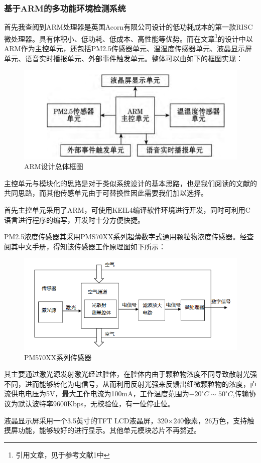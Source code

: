 \documentclass[a4paper, 11pt]{article} %
\begin{document}
\subsubsection{基于ARM的多功能环境检测系统}
\par{} 首先我查阅到ARM处理器是英国Acorn有限公司设计的低功耗成本的第一款RISC微处理器。具有体积小、低功耗、低成本、高性能等优势。而在文章\footnote{引用文章，见于参考文献1中}的设计中以ARM作为主控单元，还包括PM2.5传感器单元、温湿度传感器单元、液晶显示屏单元、语音实时播报单元、外部事件触发单元\cite{qal2017jy}。整体可以由如下的框图实现：
\begin{figure}[H]
  \centering
  \includegraphics[scale = 0.7 ]{1-2.png}
  \caption{ARM设计总体框图}
  \label{img2} 
\end{figure}
\par{} 主控单元与模块化的思路是对于类似系统设计的基本思路，也是我们阅读的文献的共同思路，而其他传感单元由于可替换性因此需要我们加以选择。
\par{} 首先主控单元采用了ARM，可使用KEIL4编译软件环境进行开发，同时可利用C语言进行程序的编写，开发时十分方便快捷。
\par{} PM2.5浓度传感器其采用PMS70XX系列超薄数字式通用颗粒物浓度传感器。经查阅其中文手册，得知该传感器工作原理图如下所示：
\begin{figure}[H]
  \centering
  \includegraphics[scale = 0.65 ]{1-3.png}
  \caption{PM570XX系列传感器}
  \label{img3} 
\end{figure}
\par{} 其主要通过激光源发射激光经过腔体，在腔体内由于颗粒物浓度不同导致散射光强不同，进而能够转化为电信号，从而利用反射光强来反馈出细微颗粒物的浓度，直流供电电压为5V，最大工作电流为100mA，工作温度范围为$-20^{\circ} C\sim 50^{\circ}C$,传输协议为默认波特率9600Kbps，无校验位，有一位停止位。
\par{} 液晶显示屏采用一个3.5英寸的TFT LCD液晶屏，320$\times 240$像素，26万色，支持触摸屏功能，能够较好的进行显示。其他单元模块芯片不再赘述。
\end{document}
